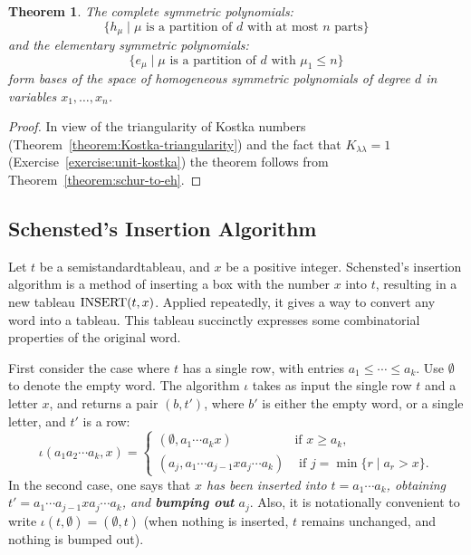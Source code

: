 \documentclass[11pt]{amsproc}
\newtheorem{theorem}{Theorem}[subsection]
\theoremstyle{definition}
\theoremstyle{example}
\newcommand{\rins}{\iota}
\newcommand{\ins}{\textup{INSERT}}
\begin{document}
\begin{theorem}
  The complete symmetric polynomials:
  \begin{displaymath}
    \{h_\mu \mid \text{$\mu$ is a partition of $d$ with at most $n$ parts}\}
  \end{displaymath}
  and the elementary symmetric polynomials:
  \begin{displaymath}
    \{e_\mu\mid \text{$\mu$ is a partition of $d$ with $\mu_1\leq n$}\}
  \end{displaymath}
  form bases of the space of homogeneous symmetric polynomials of degree $d$ in variables $x_1,\dotsc,x_n$.
\end{theorem}
\begin{proof}
  In view of the triangularity of Kostka numbers (Theorem~\ref{theorem:Kostka-triangularity}) and the fact that $K_{\lambda\lambda}=1$ (Exercise~\ref{exercise:unit-kostka}) the theorem follows from Theorem~\ref{theorem:schur-to-eh}.
\end{proof}
\subsection{Schensted's Insertion Algorithm}
\label{sec:schenst-insert-algor}
Let $t$ be a semistandard\linebreak tableau, and $x$ be a positive integer.
Schensted's insertion algorithm is a method of inserting a box with the number $x$ into $t$, resulting in a new tableau $\ins(t, x)$.
Applied repeatedly, it gives a way to convert any word into a tableau.
This tableau succinctly expresses some combinatorial properties of the original word.

First consider the case where $t$ has a single row, with entries $a_1\leq \dotsb \leq a_k$.
Use $\emptyset$ to denote the empty word.
The algorithm $\rins$ takes as input the single row $t$ and a letter $x$, and returns a pair $(b, t')$, where $b'$ is either the empty word, or a single letter, and $t'$ is a row:
\begin{displaymath}
  \rins(a_1a_2\dotsb a_k, x) =
  \begin{cases}
    (\emptyset, a_1\dotsb a_k x) & \text{if $x\geq a_k$},\\
    (a_j, a_1\dotsb a_{j-1} x a_j \dotsb a_k) & \text{ if } j = \min\{r \mid a_r > x\}.
  \end{cases}
\end{displaymath}
In the second case, one says that \emph{$x$ has been inserted into $t=a_1\dotsb a_k$, obtaining $t'=a_1\dotsb a_{j-1} x a_j \dotsb a_k$, and \textbf{bumping out} $a_j$}.
Also, it is notationally convenient to write $\rins(t, \emptyset) = (\emptyset, t)$ (when nothing is inserted, $t$ remains unchanged, and nothing is bumped out).
\end{document}

